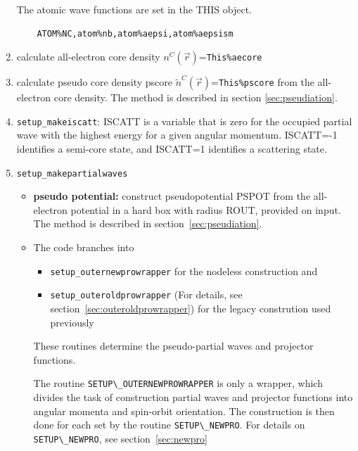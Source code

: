 \documentclass[11pt,a4paper]{report}
\begin{document}
\begin{enumerate}
  The atomic wave functions are set in the THIS object.
  \begin{verbatim}
    ATOM%NC,atom%nb,atom%aepsi,atom%aepsism
  \end{verbatim}
%
\item calculate all-electron core density $n^C(\vec{r})$=\verb|This%aecore|
%
\item calculate pseudo core density pscore
  $\tilde{n}^C(\vec{r})$=\verb|This%pscore| from the all-electron core
  density. The method is described in section \ref{sec:pseudiation}.
%
\item \verb|setup_makeiscatt|: ISCATT is a variable that is zero for
  the occupied partial wave with the highest energy for a given
  angular momentum. ISCATT=-1 identifies a semi-core state, and
  ISCATT=1 identifies a scattering state.
%
\item \verb|setup_makepartialwaves|
\begin{itemize}
\item \textbf{pseudo potential:} construct pseudopotential PSPOT from
  the all-electron potential in a hard box with radius ROUT, provided
  on input. The method is described in section~\ref{sec:pseudiation}.
%
\item The code branches into 
\begin{itemize}
\item \verb|setup_outernewprowrapper| 
for the nodeless construction and
\item \verb|setup_outeroldprowrapper| 
(For details, see section~\ref{sec:outeroldprowrapper}) 
for the legacy constrution used previously
\end{itemize}
These routines determine the pseudo-partial waves and projector
functions. 

The routine \verb|SETUP\_OUTERNEWPROWRAPPER| is only a wrapper, which
divides the task of construction partial waves and projector functions
into angular momenta and spin-orbit orientation. The construction is
then done for each set by the routine \verb|SETUP\_NEWPRO|. For
details on \verb|SETUP\_NEWPRO|, see section~\ref{sec:newpro}


\end{itemize}
\end{enumerate}
\end{document}
